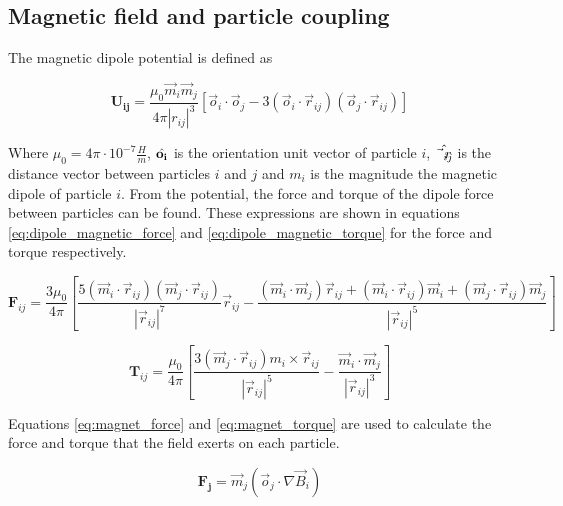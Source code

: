 \subsection{Magnetic field and particle coupling}
\label{section:lbm_colloids_magnetics}

The magnetic dipole potential is defined as

\begin{equation}
    \mathbf{U_{ij}} = \frac{\mu_0 \vec{m}_i \vec{m}_j}{4\pi |r_{ij}|^{3}} \left[ \vec{o}_i \cdot \vec{o}_j - 
    3(\vec{o}_i \cdot \vec{r}_{ij})(\vec{o}_j \cdot \vec{r}_{ij}) \right]
    \label{eq:magnet_potential}
\end{equation}

Where $\mu_0 = 4\pi \cdot 10^{-7} \frac{H}{m}$,  $\Hat{\mathbf{o_i}}$ is the orientation unit vector of particle 
$i$, $\Hat{\vec{r}_{ij}}$ is the distance vector between particles $i$ and $j$ and $m_i$ is the magnitude the 
magnetic dipole of particle $i$. From the potential, the force and torque of the dipole force between particles 
can be found. These expressions are shown in equations \ref{eq:dipole_magnetic_force} and \ref{eq:dipole_magnetic_torque} 
for the force and torque respectively.

\begin{equation}
    \mathbf{F}_{ij} = \frac{3 \mu_0}{4 \pi} [\frac{5(\vec{m}_i \cdot \vec{r}_{ij} )(\vec{m}_j
    \cdot \vec{r}_{ij})}{|\vec{r}_{ij}|^7}\vec{r}_{ij} - \frac{(\vec{m}_{i} \cdot \vec{m}_{j})\vec{r}_{ij} + 
    (\vec{m}_{i} \cdot \vec{r}_{ij})\vec{m}_{i} + (\vec{m}_{j} \cdot \vec{r}_{ij})\vec{m}_{j} }{|\vec{r}_{ij}|^5}]
\label{eq:dipole_magnetic_force}
\end{equation}

\begin{equation}
    \mathbf{T}_{ij} = \frac{\mu_0}{4 \pi}[ \frac{3(\vec{m}_{j} \cdot \vec{r}_{ij})m_i \times \vec{r}_{ij} }
    {|\vec{r}_{ij}|^5} - \frac{\vec{m}_{i} \cdot \vec{m}_{j} }{|\vec{r}_{ij}|^3} ]
    \label{eq:dipole_magnetic_torque}
\end{equation}

Equations \ref{eq:magnet_force} and \ref{eq:magnet_torque} are used to calculate the force and torque that the 
field exerts on each particle.

\begin{equation}
    \mathbf{F_{j}} = \vec{m}_{j}(\vec{o}_{j} \cdot \nabla \vec{B}_{i})
    \label{eq:magnet_force}
\end{equation}


